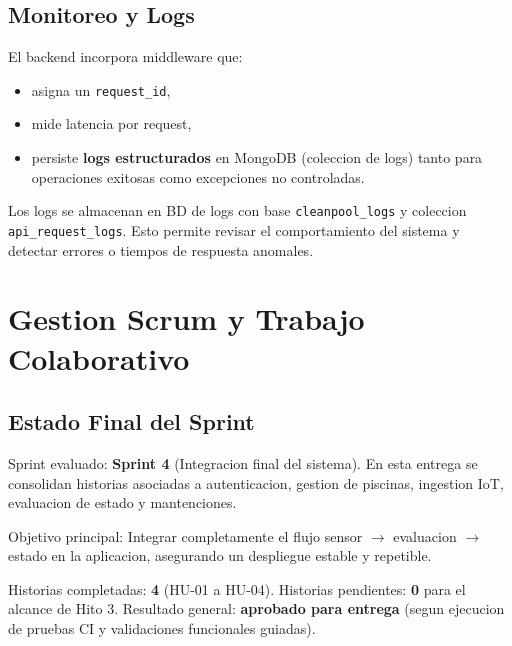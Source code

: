 \documentclass[11pt, a4paper]{article}
\begin{document}
\subsection{Monitoreo y Logs}
El backend incorpora middleware que:
\begin{itemize}
  \item asigna un \texttt{request\_id},
  \item mide latencia por request,
  \item persiste \textbf{logs estructurados} en MongoDB (coleccion de logs) tanto para operaciones exitosas como excepciones no controladas.
\end{itemize}
Los logs se almacenan en BD de logs con base \texttt{cleanpool\_logs} y coleccion \texttt{api\_request\_logs}. Esto permite revisar el comportamiento del sistema y detectar errores o tiempos de respuesta anomales.

\section{Gestion Scrum y Trabajo Colaborativo}

\subsection{Estado Final del Sprint}
Sprint evaluado: \textbf{Sprint 4} (Integracion final del sistema). En esta entrega se consolidan historias asociadas a autenticacion, gestion de piscinas, ingestion IoT, evaluacion de estado y mantenciones.

Objetivo principal: Integrar completamente el flujo sensor $\rightarrow$ evaluacion $\rightarrow$ estado en la aplicacion, asegurando un despliegue estable y repetible.

Historias completadas: \textbf{4} (HU-01 a HU-04). Historias pendientes: \textbf{0} para el alcance de Hito 3.
\linebreak
Resultado general: \textbf{aprobado para entrega} (segun ejecucion de pruebas CI y validaciones funcionales guiadas).
\end{document}
